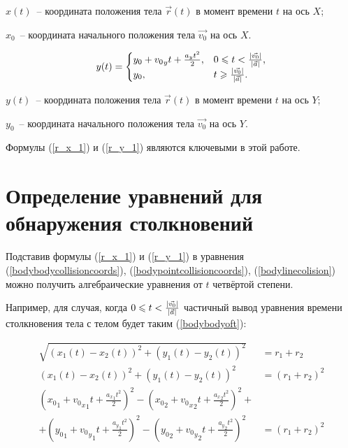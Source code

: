 \begin{Underequation}
  \(x(t)\)~-- координата положения тела \(\vec{r}(t)\) в момент времени \(t\) на ось \(X\);

  \(x_0\)~-- координата начального положения тела \(\vec{v_0}\) на ось \(X\).
\end{Underequation}

\begin{equation}\label{r_y_1}
  y(t) =
  \begin{cases}
    y_0 + {v_0}_y t + \frac{a_y t^2}{2}, & 0 \leqslant t < \frac{\left|\vec{v_0}\right|}{\left|\vec{a}\right|}, \\
    y_0,                                 & t \geqslant \frac{\left|\vec{v_0}\right|}{\left|\vec{a}\right|}.
  \end{cases}
\end{equation}

\begin{Underequation}
  \(y(t)\)~-- координата положения тела \(\vec{r}(t)\) в момент времени \(t\) на ось \(Y\);

  \(y_0\)~-- координата начального положения тела \(\vec{v_0}\) на ось \(Y\).
\end{Underequation}

Формулы (\ref{r_x_1}) и (\ref{r_y_1}) являются ключевыми в этой работе.

\section{Определение уравнений для обнаружения столкновений}

Подставив формулы (\ref{r_x_1}) и (\ref{r_y_1}) в уравнения
(\ref{bodybodycollisioncoords}), (\ref{bodypointcollisioncoords}), (\ref{bodylinecolision})
можно получить алгебраические уравнения от \(t\) четвёртой степени.

Например, для случая, когда \(0 \leqslant t < \frac{\left|\vec{v_0}\right|}{\left|\vec{a}\right|}\) частичный вывод уравнения времени столкновения тела с телом будет таким (\ref{bodybodyoft}):

\begin{align}\label{bodybodyoft}
  \sqrt{(x_1(t) - x_2(t))^2 + (y_1(t) - y_2(t))^2}        & = r_1 + r_2 \nonumber     \\
  (x_1(t) - x_2(t))^2 + (y_1(t) - y_2(t))^2               & = (r_1 + r_2)^2 \nonumber \\
  ({x_0}_1 + {{v_0}_x}_1 t + \frac{{a_x}_1 t^2}{2})^2
  - ({x_0}_2 + {{v_0}_x}_2 t + \frac{{a_x}_2 t^2}{2})^2 + & \nonumber                 \\
  + ({y_0}_1 + {{v_0}_y}_1 t + \frac{{a_y}_1 t^2}{2})^2
  - ({y_0}_2 + {{v_0}_y}_2 t + \frac{{a_y}_2 t^2}{2})^2   & = (r_1 + r_2)^2
\end{align}

